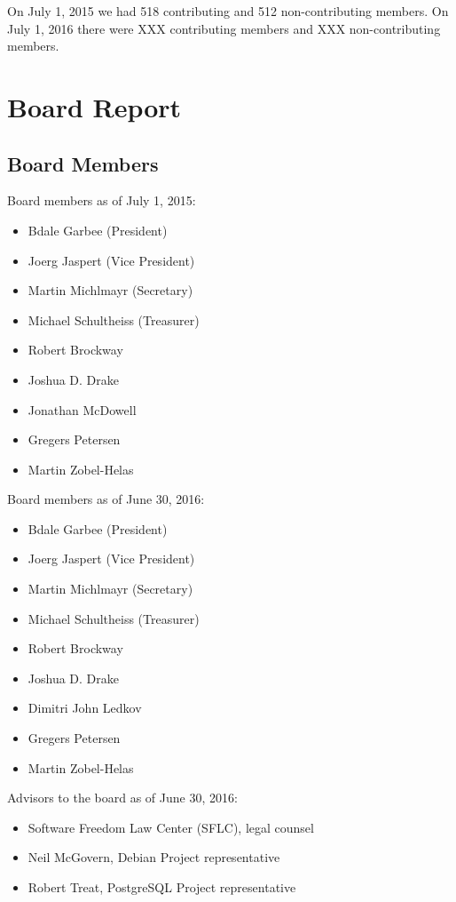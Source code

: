 \documentclass[letterpaper]{report}
\begin{document}
On July 1, 2015 we had 518 contributing and 512 non-contributing members.
On July 1, 2016 there were XXX contributing members and XXX non-contributing
members.


\chapter{Board Report}
\section{Board Members}

Board members as of July 1, 2015:

\begin{itemize}
\item Bdale Garbee (President)
\item Joerg Jaspert (Vice President)
\item Martin Michlmayr (Secretary)
\item Michael Schultheiss (Treasurer)
\item Robert Brockway
\item Joshua D. Drake
\item Jonathan McDowell
\item Gregers Petersen
\item Martin Zobel-Helas
\end{itemize}

Board members as of June 30, 2016:

\begin{itemize}
\item Bdale Garbee (President)
\item Joerg Jaspert (Vice President)
\item Martin Michlmayr (Secretary)
\item Michael Schultheiss (Treasurer)
\item Robert Brockway
\item Joshua D. Drake
\item Dimitri John Ledkov
\item Gregers Petersen
\item Martin Zobel-Helas
\end{itemize}

Advisors to the board as of June 30, 2016:

\begin{itemize}
\item Software Freedom Law Center (SFLC), legal counsel
\item Neil McGovern, Debian Project representative
\item Robert Treat, PostgreSQL Project representative
\end{itemize}
\end{document}
